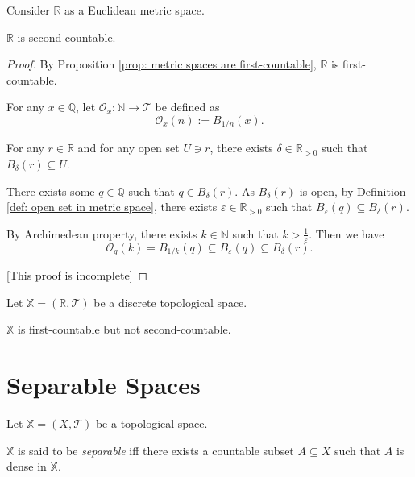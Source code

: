 \begin{example}
	Consider $\mathbb R$ as a Euclidean metric space.
	
	$\mathbb R$ is second-countable.
	
	\begin{proof}
		By Proposition \ref{prop: metric spaces are first-countable}, $\mathbb R$ is first-countable.
		
		For any $x \in \mathbb Q$, let $\mathcal O_x: \mathbb N \to \mathcal T$ be defined as
		$$
		\mathcal O_x(n) := B_{1/n}(x).
		$$
		
		For any $r \in \mathbb R$ and for any open set $U \ni r$, there exists $\delta \in \mathbb R_{> 0}$ such that $B_\delta(r) \subseteq U$.
		
		There exists some $q \in \mathbb Q$ such that $q \in B_\delta(r)$. As $B_\delta(r)$ is open, by Definition \ref{def: open set in metric space}, there exists $\varepsilon \in \mathbb R_{> 0}$ such that $B_\varepsilon(q) \subseteq B_\delta(r)$.
		
		By Archimedean property, there exists $k \in \mathbb N$ such that $k > \frac{1}{\varepsilon}$. Then we have
		$$
		\mathcal O_q(k) = B_{1/k}(q) \subseteq B_\varepsilon(q) \subseteq B_\delta(r).
		$$
		
		[This proof is incomplete]
	\end{proof}
\end{example}


\begin{example}
	Let $\mathbb X = (\mathbb R, \mathcal T)$ be a discrete topological space.
	
	$\mathbb X$ is first-countable but not second-countable.
\end{example}


\section{Separable Spaces}


\begin{definition}
	\label{def: separable}
	Let $\mathbb X = (X, \mathcal T)$ be a topological space.
	
	$\mathbb X$ is said to be \textit{separable} iff there exists a countable subset $A \subseteq X$ such that $A$ is dense in $\mathbb X$.
\end{definition}


